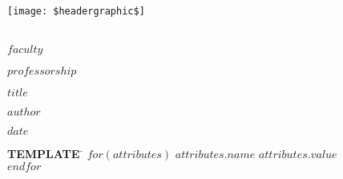\begingroup
\begin{center}

  \vspace*{-2.0cm}
  \texttt{[image: \$headergraphic\$]} \\
  \hrulefill \\[1em]
  \medskip
  \par{\huge\sffamily $faculty$}
  \medskip
  \par{\Large\sffamily $professorship$}

  \vspace*{1.5cm}

  \vfill

  \vspace*{.75cm}
  \par{\scalebox{1.5}{\Huge\bfseries $heading$}}
  \vspace*{1.5cm}
  \par{\LARGE\sffamily
    $title$\par\null}
  \vspace*{0.75cm}

  \vfill
  \vfill


  \par{\large\sffamily $author$}
  \bigskip
  \par{\large\sffamily $date$}

  \vfill

  \vspace*{1.5cm}
  \begin{minipage}{0.9\textwidth}
  \large\sffamily
  \begin{tabbing}
  {\bfseries TEMPLATE}	\quad\=\kill
    $for(attributes)$
        {\bf $attributes.name$} \>$attributes.value$\\
    $endfor$
  \end{tabbing}
  \end{minipage}
\end{center}
\endgroup

